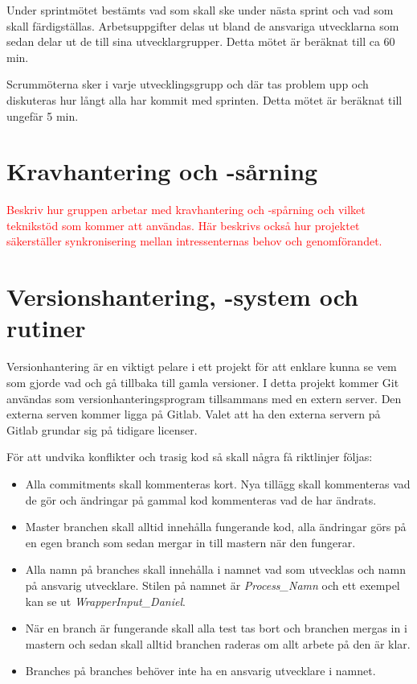 \documentclass[a4paper,12pt,oneside,final]{extbook}
\begin{document}
Under sprintmötet bestämts vad som skall ske under nästa sprint och vad som skall färdigställas. Arbetsuppgifter delas ut bland de ansvariga utvecklarna som sedan delar ut de till sina utvecklargrupper. Detta mötet är beräknat till ca 60 min.

Scrummöterna sker i varje utvecklingsgrupp och där tas problem upp och diskuteras hur långt alla har kommit med sprinten.  Detta mötet är beräknat till ungefär 5 min.

\section{Kravhantering och -sårning}

\textcolor{red}{Beskriv hur gruppen arbetar med kravhantering och -spårning och vilket teknikstöd som kommer att
användas.}
\textcolor{red}{Här beskrivs också hur projektet säkerställer synkronisering mellan intressenternas behov och genomförandet.}


\section{Versionshantering, -system och rutiner}
Versionhantering är en viktigt pelare i ett projekt för att enklare kunna se vem som gjorde vad och gå tillbaka till gamla versioner. I detta projekt kommer Git användas som versionhanteringsprogram tillsammans med en extern server. Den externa serven kommer ligga på Gitlab. Valet att ha den externa servern på Gitlab grundar sig på tidigare licenser.

För att undvika konflikter och trasig kod så skall några få riktlinjer följas:
\begin{itemize}
	\item Alla commitments skall kommenteras kort. Nya tillägg skall kommenteras vad de gör och ändringar på gammal kod kommenteras vad de har ändrats. 
	\item Master branchen skall alltid innehålla fungerande kod, alla ändringar görs på en egen branch som sedan mergar in till mastern när den fungerar.
	\item Alla namn på branches skall innehålla i namnet vad som utvecklas och namn på ansvarig utvecklare. Stilen på namnet är \textit{Process\_Namn} och ett exempel kan se ut \textit{WrapperInput\_Daniel}.
	\item När en branch är fungerande skall alla test tas bort och branchen mergas in i mastern och sedan skall alltid branchen raderas om allt arbete på den är klar.
	\item Branches på branches behöver inte ha en ansvarig utvecklare i namnet. 
\end{itemize}
\end{document}
